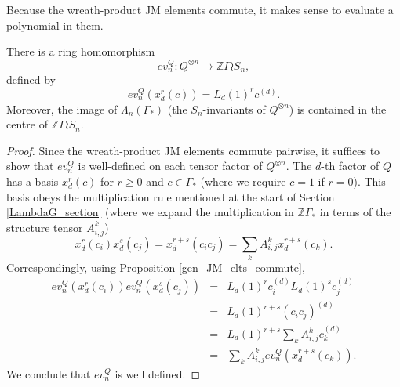 \documentclass[ALCO,Unicode]{cedram}
\begin{document}
Because the wreath-product JM elements commute, it makes sense to evaluate a polynomial in them.
\begin{proposition}
There is a ring homomorphism
\[
ev_n^Q: Q^{\otimes n} \to \mathbb{Z} \Gamma \wr S_n,
\]
defined by 
\[
ev_n^Q(x_d^r(c)) = L_d(1)^r c^{(d)}.
\]
Moreover, the image of $\Lambda_n(\Gamma_*)$ \textup{(}the $S_n$-invariants of $Q^{\otimes n}$\textup{)} is contained in the centre of $\mathbb{Z} \Gamma \wr S_n$.
\end{proposition}
\begin{proof}
Since the wreath-product JM elements commute pairwise, it suffices to show that $ev_n^Q$ is well-defined on each tensor factor of $Q^{\otimes n}$. The $d$-th factor of $Q$ has a basis $x_d^r(c)$ for $r \geq 0$ and $c \in \Gamma_*$ (where we require $c=1$ if $r=0$). This basis obeys the multiplication rule mentioned at the start of Section \ref{LambdaG_section} (where we expand the multiplication in $\mathbb{Z}\Gamma_*$ in terms of the structure tensor $A_{i,j}^k$)
\[
x_d^r(c_i) x_d^s(c_j) = x_d^{r+s}(c_ic_j) = \sum_k A_{i,j}^k x_d^{r+s}(c_k).
\]
Correspondingly, using Proposition \ref{gen_JM_elts_commute},
\begin{eqnarray*}
ev_n^Q(x_d^r(c_i))ev_n^Q(x_d^s(c_j)) &=& L_d(1)^r c_i^{(d)} L_d(1)^s c_j^{(d)} \\
&=& L_d(1)^{r+s} (c_ic_j)^{(d)} \\
&=& L_d(1)^{r+s} \sum_k A_{i,j}^k c_k^{(d)} \\
&=& \sum_k A_{i,j}^k ev_n^Q(x_d^{r+s}(c_k)).
\end{eqnarray*}
We conclude that $ev_n^Q$ is well defined. 


\end{proof}
\end{document}
